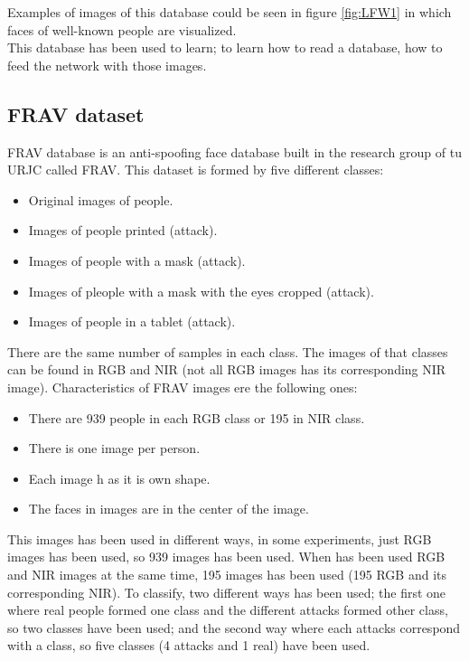 Examples of images of this database could be seen in figure \ref{fig:LFW1} in which faces of well-known people are visualized.\\


This database has been used to learn; to learn how to read a database, how to feed the network with those images.\\

\subsection{FRAV dataset}
FRAV database is an anti-spoofing face database built in the research group of tu URJC called FRAV. This dataset is formed by five different classes:\\

\begin{itemize}
 \item Original images of people.
 \item Images of people printed (attack).
 \item Images of people with a mask (attack).
 \item Images of pleople with a mask with the eyes cropped (attack).
 \item Images of people in a tablet (attack).\\
 \end{itemize}

There are the same number of samples in each class. The images of that classes can be found in RGB and NIR (not all RGB images has its corresponding NIR image). Characteristics of FRAV images ere the following ones:\\

\begin{itemize}
 \item There are 939 people in each RGB class or 195 in NIR class.
\item There is one image per person.
\item Each image h as it is own shape.
\item The faces in images are in the center of the image.\\
\end{itemize}

This images has been used in different ways, in some experiments, just RGB images has been used, so 939 images has been used. When has been used RGB and NIR images at the same time, 195 images has been used (195 RGB and its corresponding NIR). To classify, two different ways has been used; the first one where real people formed one class and the different attacks formed other class, so two classes have been used; and the second way where each attacks correspond with a class, so five classes (4 attacks and 1 real) have been used.\\

